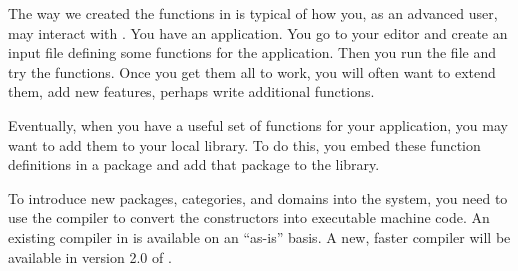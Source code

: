 The way we created the functions in  is typical of how
you, as an advanced \Language{} user, may interact with \Language{}.
You have an application.
You go to your editor and create an input file defining some
functions for the application.
Then you run the file and try the functions.
Once you get them all to work, you will often want to extend them,
add new features, perhaps write additional functions.

Eventually, when you have a useful set of functions for your application,
you may want to add them to your local \Language{} library.
To do this, you embed these function definitions in a package and add
that package to the library.

To introduce new packages, categories, and domains into the system,
you need to use the \Language{} compiler to convert the constructors
into executable machine code.
An existing compiler in \Language{} is available on an ``as-is''
basis.
A new, faster compiler will be available in version 2.0
of \Language{}.

